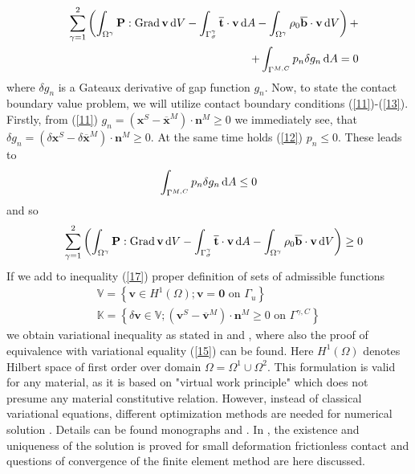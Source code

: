 \documentclass{article}
\newcommand{\bea}{\begin{eqnarray}}
\newcommand{\eea}{\end{eqnarray}}
\newcommand{\dd}{\,{\rm d}}
\begin{document}
\bea\label{15}
&&\sum^{2}_{\gamma=1}\left(\int_{\Omega^{\gamma}} \mathbf{P} : \operatorname{Grad} \mathbf{v} \dd V-\int_{\Gamma_{\sigma}^{\gamma}} \overline{\mathbf{t}} \cdot \mathbf{v} \dd A-\int_{\Omega^{\gamma}} \rho_{0}\overline{\mathbf{b}} \cdot \mathbf{v} \dd V\right)+ \nonumber
\\ 
&&+\int_{\Gamma^{M,C}} p_{n}\delta g_{n}\dd A=0
\eea
where $\delta g_{n}$ is a Gateaux derivative of gap function $g_{n}$. Now, to state the contact boundary value problem, we will utilize contact boundary conditions (\ref{11})-(\ref{13}). Firstly, from (\ref{11}) $g_{n}=\left(\mathbf{x}^{S}-\overline{\mathbf{x}}^{M}\right) \cdot \mathbf{n}^{M} \geq 0 $ we immediately see, that $\delta g_{n}=\left(\delta\mathbf{x}^{S}-\delta\overline{\mathbf{x}}^{M}\right) \cdot \mathbf{n}^{M} \geq 0 $. At the same time holds (\ref{12}) $ p_{n} \leq 0 $. These leads to 
\bea\label{16}
\int_{\Gamma^{M,C}} p_{n}\delta g_{n}\dd A \leq 0
\eea
and so
\bea\label{17}
&&\sum^{2}_{\gamma=1}\left(\int_{\Omega^{\gamma}} \mathbf{P} : \operatorname{Grad} \mathbf{v} \dd V-\int_{\Gamma_{\sigma}^{\gamma}} \overline{\mathbf{t}} \cdot \mathbf{v} \dd A-\int_{\Omega^{\gamma}} \rho_{0}\overline{\mathbf{b}} \cdot \mathbf{v} \dd V\right) \geq 0
\eea
If we add to inequality (\ref{17}) proper definition of sets of admissible functions
\begin{equation}\label{18}
\begin{array}{c}{\mathbb{V}=\left\{\mathbf{v} \in H^{1}(\Omega); \mathbf{v}=\mathbf{0} \text { on } \Gamma_{u}\right\}}
\\ 
{\mathbb{K}=\left\{\delta \mathbf{v} \in \mathbb{V}; \left(\mathbf{v}^{S}-\overline{\mathbf{v}}^{M}\right) \cdot \mathbf{n}^{M} \geq 0 \text { on } \Gamma^{\gamma,C}\right\}}\end{array} 
\end{equation}
we obtain variational inequality as stated in \cite{Duvaut} and \cite{Kikuchi}, where also the proof of equivalence with variational equality (\ref{15}) can be found. Here $H^{1}(\Omega)$ denotes Hilbert space of first order over domain $ \Omega = \Omega^{1} \cup \Omega^{2}$. This formulation is valid for any material, as it is based on "virtual work principle" which does not presume any material constitutive relation. However, instead of classical variational equations, different optimization methods are needed for numerical solution \cite[Chapter 4, p.142]{Yastrebov}. Details can be found monographs \cite{Duvaut} and \cite{Kikuchi}. In \cite{Kikuchi}, the existence and uniqueness of the solution is proved for small deformation frictionless contact and questions of convergence of the finite element method are here discussed.
\end{document}
